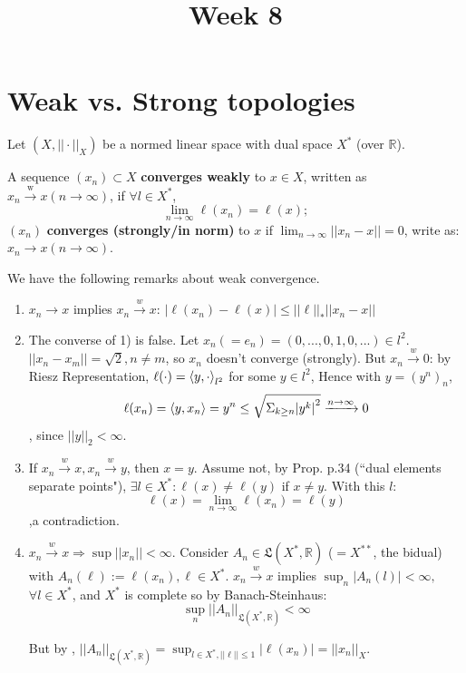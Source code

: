 \documentclass{article}
\title{Week 8}
\begin{document}
  
\author{\aut}
\maketitle
\section{Weak vs. Strong topologies}
Let $(X, || \cdot ||_X)$ be a normed linear space with dual space $X^*$ (over $\mathbb{R}$).

\begin{definition}\nl
A sequence $(x_n) \subset X$ \textbf{converges weakly} to $x\in X$, written as $x_n \xrightarrow{\text{w}} x (n \rightarrow \infty)$, if $\forall l \in X^*$, 
    $$\lim_{n\rightarrow \infty} \ell(x_n) = \ell(x);$$
$(x_n)$ \textbf{converges (strongly/in norm)} to $x$ if $\lim_{n\rightarrow \infty} ||x_n - x|| = 0$, write as: $x_n \rightarrow x (n\rightarrow \infty).$
\end{definition}

\begin{remark}
\label{properties of weak convergence}
We have the following remarks about weak convergence.  

\begin{enumerate}[1)]
    \item $x_n\rightarrow x$ implies  $x_n \xrightarrow{w} x$: $|\ell(x_n) - \ell(x)| \leq ||\ell||_* ||x_n - x||$
    
    \item The converse of 1) is false. Let $x_n (= e_n) = (0,...,0,1,0,...) \in l^2$. $||x_n-x_m|| = \sqrt{2}, n\neq m$, so $x_n$ doesn't converge (strongly). But $x_n \xrightarrow{w} 0$: by Riesz Representation, $\ell(\cdot) = \left<{y},{\cdot}\right>_{l^2}$ for some $y \in l^2$, Hence with $y=(y^n)_n$, $$\ell(x_n) = \left<{y},{x_n}\right> = y^n \leq \sqrt{\Sigma_{k\geq n} {|y^k|}^2} \xrightarrow{n\rightarrow \infty} 0$$, since $||y||_2 < \infty$.
    
    \item If $x_n \xrightarrow{w} x, x_n \xrightarrow{w} y$, then $x=y$. Assume not, by Prop. p.34 (\textquotedblleft dual elements separate points"), $\exists l \in X^*: \ell(x) \neq \ell(y)$ if $x\neq y$. With this $l$: $$\ell(x) = \lim_{n \to \infty} \ell(x_n) = \ell(y) $$ 
    ,a contradiction.
    
    \item $x_n \xrightarrow{w} x \Rightarrow \sup||x_n|| < \infty$. Consider $A_n \in \mathfrak{L}(X^*, \mathbb{R})$ ($=X^{**}$, the bidual) with $A_n(\ell) := \ell(x_n), \ell \in X^*$. $x_n \xrightarrow{w} x$ implies $\sup_n |A_n(l)| < \infty,$ $\forall l\in X^*$, and $X^*$ is complete so by Banach-Steinhaus: $$\sup_n ||A_n||_{\mathfrak{L}(X^*, \mathbb{R})} < \infty$$ 
    
    But by ,  $||A_n||_{\mathfrak{L}(X^*,\mathbb{R})} = \sup_{l\in X^*, ||\ell||\leq 1} |\ell(x_n)| = ||x_n||_X$.
\end{enumerate}
\end{remark}
\end{document}
